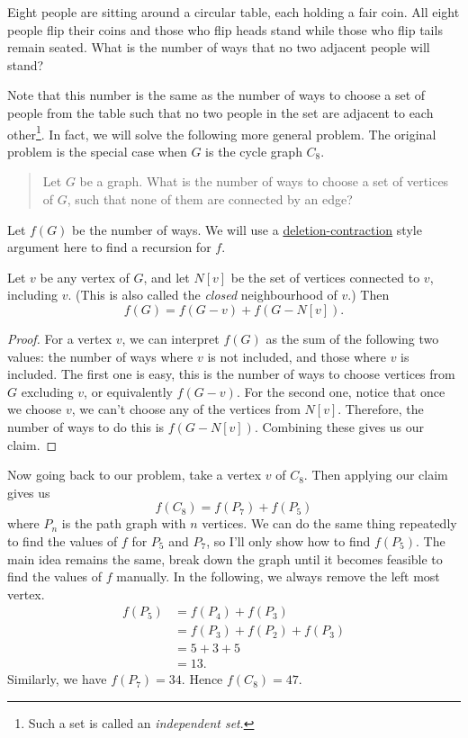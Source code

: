 \begin{question}
    Eight people are sitting around a circular table, each holding a fair coin.
    All eight people flip their coins and those who flip heads stand while
    those who flip tails remain seated. What is the number of ways that no two
    adjacent people will stand?
\end{question}
\begin{solution} 
    Note that this number is the same as the number of ways to choose a set of
    people from the table such that no two people in the set are adjacent to
    each other\footnote{Such a set is called an \emph{independent set}.}. In fact,
    we will solve the following more general problem. The original problem is
    the special case when $G$ is the cycle graph $C_8$.
    \begin{quote}
        Let $G$ be a graph. What is the
        number of ways to choose a set of vertices of $G$, such that none of
        them are connected by an edge?
    \end{quote}

    Let $f(G)$ be the number of ways. We will use a \hyperref[teq:
    DC]{deletion-contraction} style argument here to find a recursion for $f$. 

    \begin{claim} 
        Let $v$ be any vertex of $G$, and let $N[v]$ be the set of vertices
        connected to $v$, including $v$. (This is also called the \emph{closed}
        neighbourhood of $v$.) Then
        \[f(G) = f(G - v) + f(G - N[v]).\]
    \end{claim}

    \begin{proof}
    For a vertex $v$, we can interpret $f(G)$ as the sum of the following two
    values: the number of ways where $v$ is not included, and those where $v$
    is included. The first one is easy, this is the number of ways to choose
    vertices from $G$ excluding $v$, or equivalently $f(G - v)$. For the second
    one, notice that once we choose $v$, we can't choose any of the vertices
    from $N[v]$. Therefore, the number of ways to do this is $f(G - N[v])$.
    Combining these gives us our claim.
    \end{proof}
    Now going back to our problem, take a vertex $v$ of $C_8$. Then applying
    our claim gives us 
    \[ f(C_8) = f(P_7) + f(P_5) \]
    where $P_n$ is the path graph with $n$ vertices. We can do the same thing
    repeatedly to find the values of $f$ for $P_5$ and $P_7$, so I'll only show
    how to find $f(P_5)$. The main idea remains the same, break down the graph
    until it becomes feasible to find the values of $f$ manually. In the
    following, we always remove the left most vertex.
    \begin{align*}
    f(P_5) &= f(P_4) + f(P_3)\\
    &= f(P_3) + f(P_2) +f (P_3)\\
    &= 5 + 3 + 5\\
    &= 13.
    \end{align*}
    Similarly, we have $f(P_7) = 34$. Hence $f(C_8) = 47$.
\end{solution}
